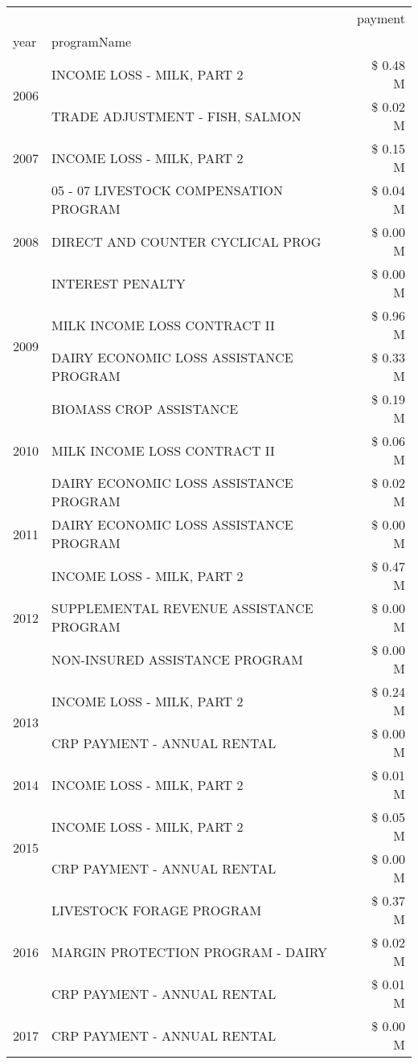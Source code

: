 \begin{tabular}{llr}
\toprule
 &  & payment \\
year & programName &  \\
\midrule
\multirow[t]{2}{*}{2006} & INCOME LOSS - MILK, PART 2 & \$ 0.48 M \\
 & TRADE ADJUSTMENT - FISH, SALMON & \$ 0.02 M \\
\cline{1-3}
2007 & INCOME LOSS - MILK, PART 2 & \$ 0.15 M \\
\cline{1-3}
\multirow[t]{3}{*}{2008} & 05 - 07 LIVESTOCK COMPENSATION PROGRAM & \$ 0.04 M \\
 & DIRECT AND COUNTER CYCLICAL PROG & \$ 0.00 M \\
 & INTEREST PENALTY & \$ 0.00 M \\
\cline{1-3}
\multirow[t]{2}{*}{2009} & MILK INCOME LOSS CONTRACT II & \$ 0.96 M \\
 & DAIRY ECONOMIC LOSS ASSISTANCE PROGRAM & \$ 0.33 M \\
\cline{1-3}
\multirow[t]{3}{*}{2010} & BIOMASS CROP ASSISTANCE & \$ 0.19 M \\
 & MILK INCOME LOSS CONTRACT II & \$ 0.06 M \\
 & DAIRY ECONOMIC LOSS ASSISTANCE PROGRAM & \$ 0.02 M \\
\cline{1-3}
2011 & DAIRY ECONOMIC LOSS ASSISTANCE PROGRAM & \$ 0.00 M \\
\cline{1-3}
\multirow[t]{3}{*}{2012} & INCOME LOSS - MILK, PART 2 & \$ 0.47 M \\
 & SUPPLEMENTAL REVENUE ASSISTANCE PROGRAM & \$ 0.00 M \\
 & NON-INSURED ASSISTANCE PROGRAM & \$ 0.00 M \\
\cline{1-3}
\multirow[t]{2}{*}{2013} & INCOME LOSS - MILK, PART 2 & \$ 0.24 M \\
 & CRP PAYMENT - ANNUAL RENTAL & \$ 0.00 M \\
\cline{1-3}
2014 & INCOME LOSS - MILK, PART 2 & \$ 0.01 M \\
\cline{1-3}
\multirow[t]{2}{*}{2015} & INCOME LOSS - MILK, PART 2 & \$ 0.05 M \\
 & CRP PAYMENT - ANNUAL RENTAL & \$ 0.00 M \\
\cline{1-3}
\multirow[t]{3}{*}{2016} & LIVESTOCK FORAGE PROGRAM & \$ 0.37 M \\
 & MARGIN PROTECTION PROGRAM - DAIRY & \$ 0.02 M \\
 & CRP PAYMENT - ANNUAL RENTAL & \$ 0.01 M \\
\cline{1-3}
\multirow[t]{2}{*}{2017} & CRP PAYMENT - ANNUAL RENTAL & \$ 0.00 M \\

\end{tabular}
